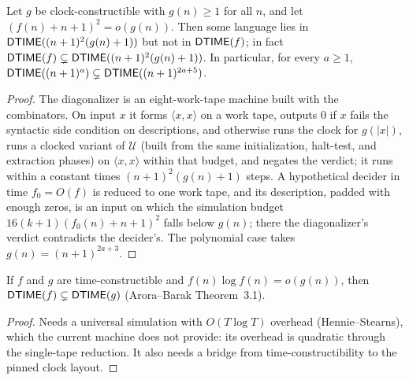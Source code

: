 \begin{theorem}
  \label{thm:time-hierarchy}
  \leanok
  Let $g$ be clock-constructible with $g(n) \ge 1$ for all $n$, and let
  $(f(n) + n + 1)^2 = o(g(n))$. Then some language lies in
  $\mathsf{DTIME}((n+1)^2 (g(n) + 1))$ but not in $\mathsf{DTIME}(f)$; in fact
  $\mathsf{DTIME}(f) \subsetneq \mathsf{DTIME}((n+1)^2 (g(n) + 1))$. In particular, for
  every $a \ge 1$,
  $\mathsf{DTIME}((n+1)^a) \subsetneq \mathsf{DTIME}((n+1)^{2a+5})$.
\end{theorem}
\begin{proof}
  \leanok
  The diagonalizer is an eight-work-tape machine built with the combinators.
  On input $x$ it forms $\langle x, x \rangle$ on a work tape, outputs $0$ if
  $x$ fails the syntactic side condition on descriptions, and otherwise runs
  the clock for $g(|x|)$, runs a clocked variant of $\mathcal{U}$ (built from
  the same initialization, halt-test, and extraction phases) on
  $\langle x, x \rangle$ within that budget, and negates the verdict; it runs
  within a constant times $(n+1)^2 (g(n) + 1)$ steps. A hypothetical decider in
  time $f_0 = O(f)$ is reduced to one work tape, and its description, padded
  with enough zeros, is an input on which the simulation budget
  $16(k+1)(f_0(n) + n + 1)^2$ falls below $g(n)$; there the diagonalizer's
  verdict contradicts the decider's. The polynomial case takes
  $g(n) = (n+1)^{2a+3}$.
\end{proof}

\begin{theorem}
  \label{thm:models-time-hierarchy-strong}
  If $f$ and $g$ are time-constructible and $f(n) \log f(n) = o(g(n))$, then
  $\mathsf{DTIME}(f) \subsetneq \mathsf{DTIME}(g)$ (Arora--Barak Theorem~3.1).
\end{theorem}
\begin{proof}
  Needs a universal simulation with $O(T \log T)$ overhead
  (Hennie--Stearns), which the current machine does not provide: its overhead
  is quadratic through the single-tape reduction. It also needs a bridge from
  time-constructibility to the pinned clock layout.
\end{proof}

